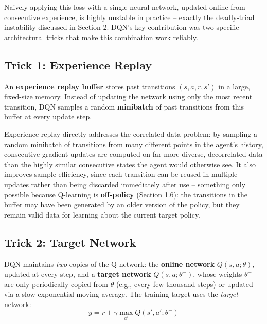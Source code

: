 \documentclass[12pt,a4paper]{article}
\begin{document}
\begin{keyidea}
Naively applying this loss with a single neural network, updated online from consecutive experience, is highly unstable in practice -- exactly the deadly-triad instability discussed in Section 2. DQN's key contribution was two specific architectural tricks that make this combination work reliably.
\end{keyidea}

\subsection{Trick 1: Experience Replay}

\begin{defbox}
An \textbf{experience replay buffer} stores past transitions $(s,a,r,s')$ in a large, fixed-size memory. Instead of updating the network using only the most recent transition, DQN samples a random \textbf{minibatch} of past transitions from this buffer at every update step.
\end{defbox}

\begin{keyidea}
Experience replay directly addresses the correlated-data problem: by sampling a random minibatch of transitions from many different points in the agent's history, consecutive gradient updates are computed on far more diverse, decorrelated data than the highly similar consecutive states the agent would otherwise see. It also improves sample efficiency, since each transition can be reused in multiple updates rather than being discarded immediately after use -- something only possible because Q-learning is \textbf{off-policy} (Section 1.6): the transitions in the buffer may have been generated by an older version of the policy, but they remain valid data for learning about the current target policy.
\end{keyidea}

\subsection{Trick 2: Target Network}

\begin{defbox}
DQN maintains \emph{two} copies of the Q-network: the \textbf{online network} $Q(s,a;\theta)$, updated at every step, and a \textbf{target network} $Q(s,a;\theta^-)$, whose weights $\theta^-$ are only periodically copied from $\theta$ (e.g., every few thousand steps) or updated via a slow exponential moving average. The training target uses the \emph{target} network:
\[
y = r + \gamma \max_{a'} Q(s',a';\theta^-)
\]
\end{defbox}
\end{document}
